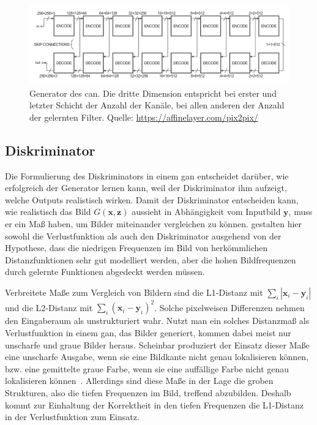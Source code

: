 \begin{figure}
	\centering
	\includegraphics[width=\linewidth]{img/can_generator}
	\caption[Generator des \gls{can}]{Generator des \gls{can}. Die dritte Dimension entspricht bei erster und letzter Schicht der Anzahl der Kanäle, bei allen anderen der Anzahl der gelernten Filter. Quelle: \url{https://affinelayer.com/pix2pix/}}
	\label{fig:cangenerator}
\end{figure}



\subsection{Diskriminator}

Die Formulierung des Diskriminators in einem \gls{gan} entscheidet darüber, wie erfolgreich der Generator lernen kann, weil der Diskriminator ihm aufzeigt, welche Outputs realistisch wirken.
Damit der Diskriminator entscheiden kann, wie realistisch das Bild $ G(\mathbf{x}, \mathbf{z}) $ aussieht in Abhängigkeit vom Inputbild $ \mathbf{y} $, muss er ein Maß haben, um Bilder miteinander vergleichen zu können.
\citeauthor{Isola.2017} gestalten hier sowohl die Verlustfunktion als auch den Diskriminator ausgehend von der Hypothese, dass die niedrigen Frequenzen im Bild von herkömmlichen Distanzfunktionen sehr gut modelliert werden, aber die hohen Bildfrequenzen durch gelernte Funktionen abgedeckt werden müssen.

Verbreitete Maße zum Vergleich von Bildern sind die L1-Distanz mit $ \sum_i | \mathbf{x}_i - \mathbf{y}_i | $ und die L2-Distanz mit $ \sum_i (\mathbf{x}_i - \mathbf{y}_i)^2 $.
Solche pixelweisen Differenzen nehmen den Eingaberaum als unstrukturiert wahr.
Nutzt man ein solches Distanzmaß als Verlustfunktion in einem \gls{gan}, das Bilder generiert, kommen dabei meist nur unscharfe und graue Bilder heraus.
Scheinbar produziert der Einsatz dieser Maße eine unscharfe Ausgabe, wenn sie eine Bildkante nicht genau lokalisieren können, bzw. eine gemittelte graue Farbe, wenn sie eine auffällige Farbe nicht genau lokalisieren können~\cite{Isola.2017}.
Allerdings sind diese Maße in der Lage die groben Strukturen, also die tiefen Frequenzen im Bild, treffend abzubilden.
Deshalb kommt zur Einhaltung der Korrektheit in den tiefen Frequenzen die L1-Distanz in der Verlustfunktion zum Einsatz.

